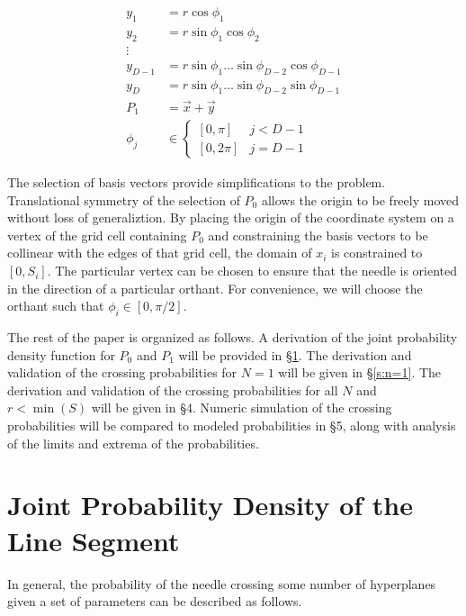 \documentclass{article}
\begin{document}
\begin{align*}
    y_1 &= r\cos{\phi_1}\\
    y_2 &= r\sin{\phi_1}\cos{\phi_2}\\
    \vdots\\
    y_{D-1} &= r\sin{\phi_1}\hdots\sin{\phi_{D-2}}\cos{\phi_{D-1}}\\
    y_{D} &= r\sin{\phi_1}\hdots\sin{\phi_{D-2}}\sin{\phi_{D-1}}\\
    P_1 &= \vec{x} + \vec{y}\\
	\phi_j &\in \begin{cases}[0, \pi] & j<D-1 \\ [0, 2\pi] & j=D-1\end{cases}
\end{align*}

The selection of basis vectors provide simplifications to the problem. Translational symmetry of the selection
of $P_0$ allows the origin to be freely moved without loss of generaliztion. By placing the origin of the coordinate
system on a vertex of the grid cell containing $P_0$ and constraining the basis vectors to be collinear with the
edges of that grid cell, the domain of $x_i$ is constrained to $[0, S_i]$. The particular vertex can be chosen
to ensure that the needle is oriented in the direction of a particular orthant. For convenience, we will choose
the orthant such that $\phi_i \in [0, \pi/2].$

The rest of the paper is organized as follows. A derivation of the joint probability density function for $P_0$ and $P_1$ will be provided in \S \ref{s:needle pdf}. The derivation and validation
of the crossing probabilities for $N=1$ will be given in \S \ref{s:n=1}. The derivation and validation of the crossing probabilities for all $N$ and $r<\min(S)$ will be given in \S 4. Numeric
simulation of the crossing probabilities will be compared to modeled probabilities in \S 5, along with analysis of the limits
and extrema of the probabilities.

\section{Joint Probability Density of the Line Segment} \label{s:needle pdf}
In general, the probability of the needle crossing some number of hyperplanes given
a set of parameters can be described as follows.
\end{document}
